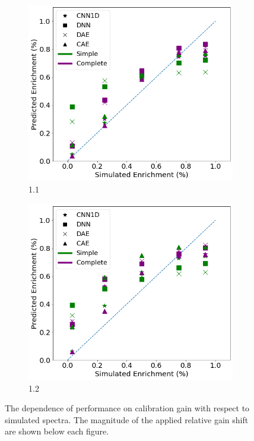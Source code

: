 \begin{figure}[H]
     \begin{subfigure}[b]{0.49\textwidth}
         \centering
         \includegraphics[width=\textwidth]{images/simuranium-cal11.png}
         \caption{1.1}
         \label{fig:simuranium-cal11}
     \end{subfigure}
     \hfill
     \begin{subfigure}[b]{0.49\textwidth}
         \centering
         \includegraphics[width=\textwidth]{images/simuranium-cal12.png}
         \caption{1.2}
         \label{fig:simuranium-cal12}
     \end{subfigure}
        \caption{The dependence of performance on calibration gain with respect to simulated spectra. The magnitude of the applied relative gain shift are shown below each figure.}
        \label{fig:simuranium-cal}
\end{figure}





